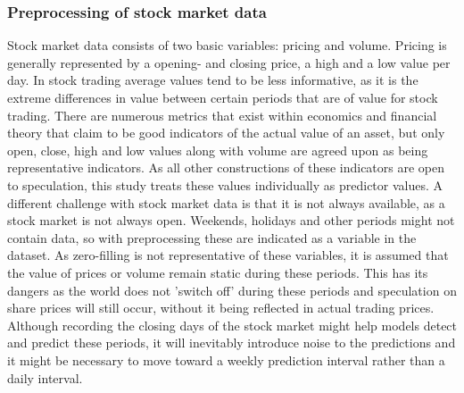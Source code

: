 \subsubsection{Preprocessing of stock market data}
Stock market data consists of two basic variables: pricing and volume. Pricing is generally represented by a opening- and closing price, a high and a low value per day. In stock trading average values tend to be less informative, as it is the extreme differences in value between certain periods that are of value for stock trading. There are numerous metrics that exist within economics and financial theory that claim to be good indicators of the actual value of an asset, but only open, close, high and low values along with volume are agreed upon as being representative indicators. As all other constructions of these indicators are open to speculation, this study treats these values individually as predictor values.
A different challenge with stock market data is that it is not always available, as a stock market is not always open. Weekends, holidays and other periods might not contain data, so with preprocessing these are indicated as a variable in the dataset. As zero-filling is not representative of these variables, it is assumed that the value of prices or volume remain static during these periods. This has its dangers as the world does not 'switch off' during these periods and speculation on share prices will still occur, without it being reflected in actual trading prices. Although recording the closing days of the stock market might help models detect and predict these periods, it will inevitably introduce noise to the predictions and it might be necessary to move toward a weekly prediction interval rather than a daily interval.

